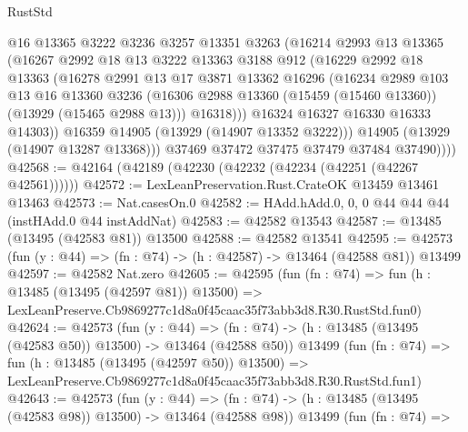\begin{lexlean}{RustStd}
\begin{coremodule}
                @16
                @13365
                @3222
                @3236
                @3257
                @13351
                @3263
                (@16214
                  @2993
                  @13
                  @13365
                  (@16267
                    @2992
                    @18
                    @13
                    @3222
                    @13363
                    @3188
                    @912
                    (@16229
                      @2992
                      @18
                      @13363
                      (@16278
                        @2991
                        @13
                        @17
                        @3871
                        @13362
                        @16296
                        (@16234
                          @2989
                          @103
                          @13
                          @16
                          @13360
                          @3236
                          (@16306 @2988 @13360 (@15459 (@15460 @13360)) (@13929 (@15465 @2988 @13)))
                          @16318)))
                    @16324
                    @16327
                    @16330
                    @16333
                    @14303))
                @16359
                @14905
                (@13929 (@14907 @13352 @3222)))
              @14905
              (@13929 (@14907 @13287 @13368)))
            @37469
            @37472
            @37475
            @37479
            @37484
            @37490))))
@42568 := @42164 (@42189 (@42230 (@42232 (@42234 (@42251 (@42267 @42561))))))
@42572 := LexLeanPreservation.Rust.CrateOK @13459 @13461 @13463
@42573 := Nat.casesOn.{0}
@42582 := HAdd.hAdd.{0, 0, 0} @44 @44 @44 (instHAdd.{0} @44 instAddNat)
@42583 := @42582 @13543
@42587 := @13485 (@13495 (@42583 @81)) @13500
@42588 := @42582 @13541
@42595 := @42573 (fun (y : @44) => (fn : @74) -> (h : @42587) -> @13464 (@42588 @81)) @13499
@42597 := @42582 Nat.zero
@42605 := @42595
    (fun (fn : @74) =>
    fun (h : @13485 (@13495 (@42597 @81)) @13500) =>
    LexLeanPreserve.Cb9869277c1d8a0f45caac35f73abb3d8.R30.RustStd.fun0)
@42624 := @42573
    (fun (y : @44) =>
    (fn : @74) -> (h : @13485 (@13495 (@42583 @50)) @13500) -> @13464 (@42588 @50))
    @13499
    (fun (fn : @74) =>
    fun (h : @13485 (@13495 (@42597 @50)) @13500) =>
    LexLeanPreserve.Cb9869277c1d8a0f45caac35f73abb3d8.R30.RustStd.fun1)
@42643 := @42573
    (fun (y : @44) =>
    (fn : @74) -> (h : @13485 (@13495 (@42583 @98)) @13500) -> @13464 (@42588 @98))
    @13499
    (fun (fn : @74) =>

\end{coremodule}
\end{lexlean}
